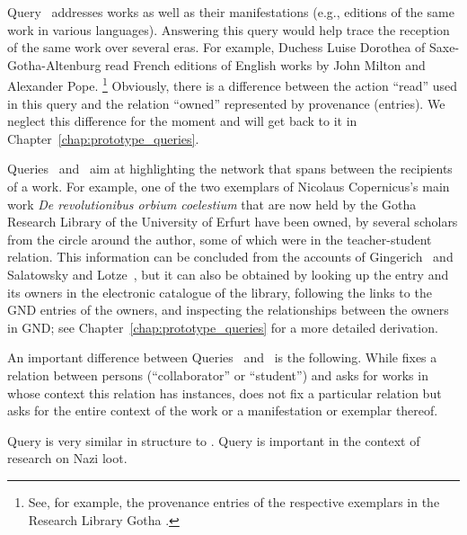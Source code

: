 Query~ addresses works as well as their manifestations
(e.g., editions of the same work in various languages).
Answering this query would help trace the reception
of the same work over several eras.
For example, Duchess Luise Dorothea of Saxe-Gotha-Altenburg
read French editions of English works by John Milton and Alexander Pope.%
\footnote{See, for example, the provenance entries of the respective exemplars in the Research Library Gotha \autocite{OPACLuiseDorotheaMiltonPope}.}
Obviously, there is a difference between the action \enquote{read}
used in this query and the relation \enquote{owned} represented by
provenance (entries). We neglect this difference for the moment
and will get back to it in Chapter~\ref{chap:prototype_queries}.

Queries~ and~
aim at highlighting the network
that spans between the recipients of a work.
For example, one of the two exemplars of Nicolaus Copernicus's
main work \emph{De revolutionibus orbium coelestium} \autocite{Kopernikus1543}
that are now held by the Gotha Research Library of the University of Erfurt
have been owned, by several scholars
from the circle around the author,
some of which were in the teacher-student relation.
This information can be concluded
from the accounts of Gingerich~\autocite[p.\,69]{Gingerich2002}
and Salatowsky and Lotze~\autocite[p.\,142]{Salatowsky2015},
but it can also be obtained by looking up the entry and its owners in the electronic catalogue of the library,
following the links to the \gls{GND} entries of the owners,
and inspecting the relationships between the owners in \gls{GND};
see Chapter~\ref{chap:prototype_queries} for a more detailed derivation.

An important difference between Queries~ and~ is the following.
While  fixes a relation between persons (\enquote{collaborator} or \enquote{student})
and asks for works in whose context this relation has instances,
 does not fix a particular relation but asks for the entire context of
the work or a manifestation or exemplar thereof.

Query  is very similar in structure to .
Query  is important in the context of research on Nazi loot.



